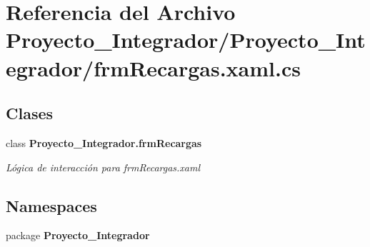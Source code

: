 \section{Referencia del Archivo Proyecto\-\_\-\-Integrador/\-Proyecto\-\_\-\-Integrador/frm\-Recargas.xaml.\-cs}
\label{frm_recargas_8xaml_8cs}
\subsection*{Clases}
\begin{DoxyCompactItemize}
\item 
class {\bf Proyecto\-\_\-\-Integrador.\-frm\-Recargas}
\begin{DoxyCompactList}\small\item\em Lógica de interacción para frm\-Recargas.\-xaml \end{DoxyCompactList}\end{DoxyCompactItemize}
\subsection*{Namespaces}
\begin{DoxyCompactItemize}
\item 
package {\bf Proyecto\-\_\-\-Integrador}
\end{DoxyCompactItemize}
